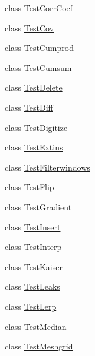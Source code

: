 \begin{DoxyCompactItemize}
\item 
class \hyperlink{classnumpy_1_1lib_1_1tests_1_1test__function__base_1_1TestCorrCoef}{Test\+Corr\+Coef}
\item 
class \hyperlink{classnumpy_1_1lib_1_1tests_1_1test__function__base_1_1TestCov}{Test\+Cov}
\item 
class \hyperlink{classnumpy_1_1lib_1_1tests_1_1test__function__base_1_1TestCumprod}{Test\+Cumprod}
\item 
class \hyperlink{classnumpy_1_1lib_1_1tests_1_1test__function__base_1_1TestCumsum}{Test\+Cumsum}
\item 
class \hyperlink{classnumpy_1_1lib_1_1tests_1_1test__function__base_1_1TestDelete}{Test\+Delete}
\item 
class \hyperlink{classnumpy_1_1lib_1_1tests_1_1test__function__base_1_1TestDiff}{Test\+Diff}
\item 
class \hyperlink{classnumpy_1_1lib_1_1tests_1_1test__function__base_1_1TestDigitize}{Test\+Digitize}
\item 
class \hyperlink{classnumpy_1_1lib_1_1tests_1_1test__function__base_1_1TestExtins}{Test\+Extins}
\item 
class \hyperlink{classnumpy_1_1lib_1_1tests_1_1test__function__base_1_1TestFilterwindows}{Test\+Filterwindows}
\item 
class \hyperlink{classnumpy_1_1lib_1_1tests_1_1test__function__base_1_1TestFlip}{Test\+Flip}
\item 
class \hyperlink{classnumpy_1_1lib_1_1tests_1_1test__function__base_1_1TestGradient}{Test\+Gradient}
\item 
class \hyperlink{classnumpy_1_1lib_1_1tests_1_1test__function__base_1_1TestInsert}{Test\+Insert}
\item 
class \hyperlink{classnumpy_1_1lib_1_1tests_1_1test__function__base_1_1TestInterp}{Test\+Interp}
\item 
class \hyperlink{classnumpy_1_1lib_1_1tests_1_1test__function__base_1_1TestKaiser}{Test\+Kaiser}
\item 
class \hyperlink{classnumpy_1_1lib_1_1tests_1_1test__function__base_1_1TestLeaks}{Test\+Leaks}
\item 
class \hyperlink{classnumpy_1_1lib_1_1tests_1_1test__function__base_1_1TestLerp}{Test\+Lerp}
\item 
class \hyperlink{classnumpy_1_1lib_1_1tests_1_1test__function__base_1_1TestMedian}{Test\+Median}
\item 
class \hyperlink{classnumpy_1_1lib_1_1tests_1_1test__function__base_1_1TestMeshgrid}{Test\+Meshgrid}

\end{DoxyCompactItemize}
